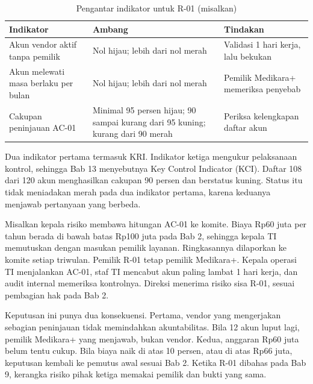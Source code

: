 \begin{table}[!htb]
  \centering\small
  \caption{Pengantar indikator untuk R-01 (misalkan)}\label{tab:ch05-kri}
  \begin{tabularx}{\textwidth}{|>{\raggedright\arraybackslash}X|>{\raggedright\arraybackslash}p{}|>{\raggedright\arraybackslash}X|}
    \hline
    \textbf{Indikator} & \textbf{Ambang} & \textbf{Tindakan} \\ \hline
    Akun vendor aktif tanpa pemilik & Nol hijau; lebih dari nol merah & Validasi 1 hari kerja, lalu
    bekukan \\ \hline
    Akun melewati masa berlaku per bulan & Nol hijau; lebih dari nol merah & Pemilik Medikara+
    memeriksa penyebab \\ \hline
    Cakupan peninjauan AC-01 & Minimal 95 persen hijau; 90 sampai kurang dari 95 kuning; kurang dari
    90 merah & Periksa kelengkapan daftar akun \\ \hline
  \end{tabularx}
\end{table}

Dua indikator pertama termasuk KRI. Indikator ketiga mengukur pelaksanaan kontrol, sehingga Bab 13
menyebutnya Key Control Indicator (KCI). Daftar 108 dari 120 akun menghasilkan cakupan 90 persen dan
berstatus kuning. Status itu tidak meniadakan merah pada dua indikator pertama, karena keduanya
menjawab pertanyaan yang berbeda.

\begin{kasus}[title={Kasus Medikara Health: Rp60 Juta untuk AC-01}]
Misalkan kepala risiko membawa hitungan AC-01 ke komite. Biaya Rp60 juta per tahun berada di bawah
batas Rp100 juta pada Bab 2, sehingga kepala TI memutuskan dengan masukan pemilik layanan.
Ringkasannya dilaporkan ke komite setiap triwulan. Pemilik R-01 tetap pemilik Medikara+. Kepala
operasi TI menjalankan AC-01, staf TI mencabut akun paling lambat 1 hari kerja, dan audit internal
memeriksa kontrolnya. Direksi menerima risiko sisa R-01, sesuai pembagian hak pada Bab 2.

Keputusan ini punya dua konsekuensi. Pertama, vendor yang mengerjakan sebagian peninjauan tidak
memindahkan akuntabilitas. Bila 12 akun luput lagi, pemilik Medikara+ yang menjawab, bukan vendor.
Kedua, anggaran Rp60 juta belum tentu cukup. Bila biaya naik di atas 10 persen, atau di atas Rp66
juta, keputusan kembali ke pemutus awal sesuai Bab 2. Ketika R-01 dibahas pada Bab 9, kerangka
risiko pihak ketiga memakai pemilik dan bukti yang sama.
\end{kasus}

